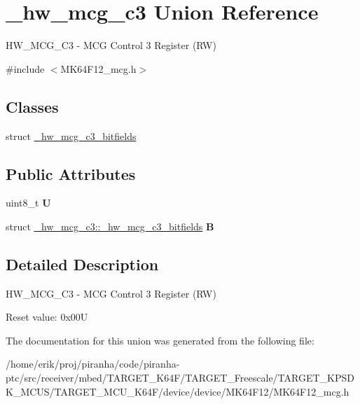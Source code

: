 \hypertarget{union__hw__mcg__c3}{}\section{\+\_\+hw\+\_\+mcg\+\_\+c3 Union Reference}
\label{union__hw__mcg__c3}


H\+W\+\_\+\+M\+C\+G\+\_\+\+C3 -\/ M\+CG Control 3 Register (RW)  




{\ttfamily \#include $<$M\+K64\+F12\+\_\+mcg.\+h$>$}

\subsection*{Classes}
\begin{DoxyCompactItemize}
\item 
struct \hyperlink{struct__hw__mcg__c3_1_1__hw__mcg__c3__bitfields}{\+\_\+hw\+\_\+mcg\+\_\+c3\+\_\+bitfields}
\end{DoxyCompactItemize}
\subsection*{Public Attributes}
\begin{DoxyCompactItemize}
\item 
uint8\+\_\+t {\bfseries U}\hypertarget{union__hw__mcg__c3_a55d8fc3b13771d041fd11ecd7dbb4020}{}\label{union__hw__mcg__c3_a55d8fc3b13771d041fd11ecd7dbb4020}

\item 
struct \hyperlink{struct__hw__mcg__c3_1_1__hw__mcg__c3__bitfields}{\+\_\+hw\+\_\+mcg\+\_\+c3\+::\+\_\+hw\+\_\+mcg\+\_\+c3\+\_\+bitfields} {\bfseries B}\hypertarget{union__hw__mcg__c3_aee3c3bc218d4302499b2fadfea44ca03}{}\label{union__hw__mcg__c3_aee3c3bc218d4302499b2fadfea44ca03}

\end{DoxyCompactItemize}


\subsection{Detailed Description}
H\+W\+\_\+\+M\+C\+G\+\_\+\+C3 -\/ M\+CG Control 3 Register (RW) 

Reset value\+: 0x00U 

The documentation for this union was generated from the following file\+:\begin{DoxyCompactItemize}
\item 
/home/erik/proj/piranha/code/piranha-\/ptc/src/receiver/mbed/\+T\+A\+R\+G\+E\+T\+\_\+\+K64\+F/\+T\+A\+R\+G\+E\+T\+\_\+\+Freescale/\+T\+A\+R\+G\+E\+T\+\_\+\+K\+P\+S\+D\+K\+\_\+\+M\+C\+U\+S/\+T\+A\+R\+G\+E\+T\+\_\+\+M\+C\+U\+\_\+\+K64\+F/device/device/\+M\+K64\+F12/M\+K64\+F12\+\_\+mcg.\+h\end{DoxyCompactItemize}
